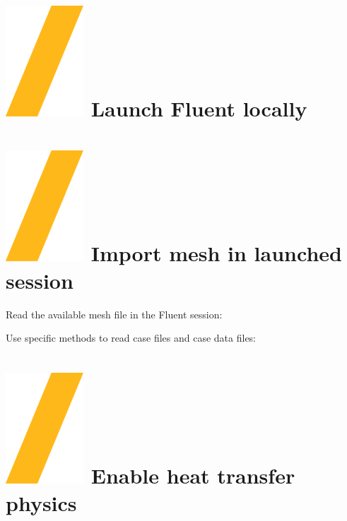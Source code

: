 \documentclass[9pt,landscape]{article}
\begin{document}
\begin{multicols}{3}
\setlength{\premulticols}{1pt}
\setlength{\postmulticols}{1pt}
\setlength{\multicolsep}{1pt}
\setlength{\columnsep}{2pt}

\vfill

\section{\includegraphics[height=\fontcharht\font`\S]{slash.png} Launch Fluent locally} 

\section{\includegraphics[height=\fontcharht\font`\S]{slash.png} Import mesh in launched session}

Read the available mesh file in the Fluent session:


Use specific methods to read case files and case data files:



\section{\includegraphics[height=\fontcharht\font`\S]{slash.png} Enable heat transfer physics}


\end{multicols}
\end{document}
